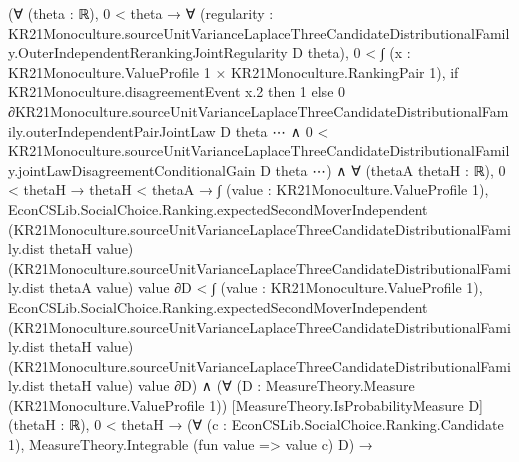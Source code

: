 \documentclass[10pt]{article}
\begin{document}
\begin{ReviewVerbatim}
                      (∀ (theta : ℝ),
                          0 < theta →
                            ∀
                              (regularity :
                                KR21Monoculture.sourceUnitVarianceLaplaceThreeCandidateDistributionalFamily.OuterIndependentRerankingJointRegularity
                                  D theta),
                              0 <
                                  ∫ (x : KR21Monoculture.ValueProfile 1 × KR21Monoculture.RankingPair 1),
                                    if KR21Monoculture.disagreementEvent x.2 then 1
                                    else
                                      0 ∂KR21Monoculture.sourceUnitVarianceLaplaceThreeCandidateDistributionalFamily.outerIndependentPairJointLaw
                                      D theta ⋯ ∧
                                0 <
                                  KR21Monoculture.sourceUnitVarianceLaplaceThreeCandidateDistributionalFamily.jointLawDisagreementConditionalGain
                                    D theta ⋯) ∧
                        ∀ (thetaA thetaH : ℝ),
                          0 < thetaH →
                            thetaH < thetaA →
                              ∫ (value : KR21Monoculture.ValueProfile 1),
                                  EconCSLib.SocialChoice.Ranking.expectedSecondMoverIndependent
                                    (KR21Monoculture.sourceUnitVarianceLaplaceThreeCandidateDistributionalFamily.dist
                                      thetaH value)
                                    (KR21Monoculture.sourceUnitVarianceLaplaceThreeCandidateDistributionalFamily.dist
                                      thetaA value)
                                    value ∂D <
                                ∫ (value : KR21Monoculture.ValueProfile 1),
                                  EconCSLib.SocialChoice.Ranking.expectedSecondMoverIndependent
                                    (KR21Monoculture.sourceUnitVarianceLaplaceThreeCandidateDistributionalFamily.dist
                                      thetaH value)
                                    (KR21Monoculture.sourceUnitVarianceLaplaceThreeCandidateDistributionalFamily.dist
                                      thetaH value)
                                    value ∂D) ∧
                (∀ (D : MeasureTheory.Measure (KR21Monoculture.ValueProfile 1)) [MeasureTheory.IsProbabilityMeasure D]
                    (thetaH : ℝ),
                    0 < thetaH →
                      (∀ (c : EconCSLib.SocialChoice.Ranking.Candidate 1),
                          MeasureTheory.Integrable (fun value => value c) D) →

\end{ReviewVerbatim}
\end{document}
